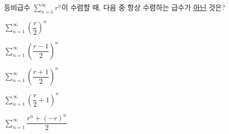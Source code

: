 등비급수 $\displaystyle\sum_{n=1}^{\infty} r^n$이 수렴할 때, 다음 중 항상 수렴하는 급수가 \underline{아닌} 것은?
\begin{choicesii}{\rule[-3ex]{0pt}{8ex}$\displaystyle\sum_{n=1}^{\infty} \left(\dfrac{r}{2}\right)^n$}{\rule[-3ex]{0pt}{8ex}$\displaystyle\sum_{n=1}^{\infty} \left(\dfrac{r-1}{2}\right)^n$}{\rule[-3ex]{0pt}{8ex}$\displaystyle\sum_{n=1}^{\infty} \left(\dfrac{r+1}{2}\right)^n$}{\rule[-3ex]{0pt}{8ex}$\displaystyle\sum_{n=1}^{\infty} \left(\dfrac{r}{2}+1\right)^n$}{\rule[-3ex]{0pt}{8ex}$\displaystyle\sum_{n=1}^{\infty} \dfrac{r^n+(-r)^n}{2}$}\end{choicesii}
